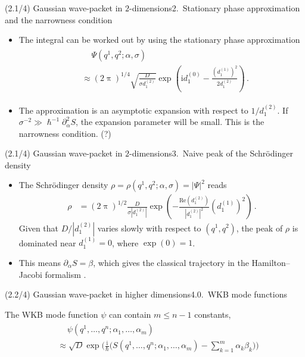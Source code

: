 \documentclass[mathserif]{beamer}
\newcommand{\rbr}[1]{{\left(#1\right)}}
\newcommand{\vbr}[1]{{\left|#1\right|}}
\newcommand{\rfun}[2]{#1\mathopen{}\left(#2\right)\mathclose{}}
\newcommand\mi{\mathrm{i}} %
\begin{document}
\begin{frame}{\boldmath (2.1/4) Gaussian wave-packet in $2$-dimensions}{2.\ Stationary phase approximation and the narrowness condition}
\begin{itemize}
    \item The integral can be worked out by using the stationary phase approximation
    \begin{align}
    \begin{split}
    &\quad\,\rfun{\varPsi}{q^1, q^2; \alpha, \sigma}
    \\
    &\approx \rbr{2\uppi}^{1/4}\sqrt{\frac{D}{\sigma d^{(2)}_1}}
    \rfun{\exp}{\mi d^{(0)}_1 - \frac{\rbr{d^{(1)}_1}^{2}}{2d^{(2)}_1}}\,.
    \end{split}
\end{align}
\item
The approximation is an asymptotic expansion with respect to $1/d_1^{(2)}$. If $\sigma^{-2} \gg \hslash^{-1} \partial_\alpha^2 S$, the expansion parameter will be small. This is the \alert{narrowness condition}. (?)

\end{itemize}
\end{frame}

\begin{frame}{\boldmath (2.1/4) Gaussian wave-packet in $2$-dimensions}{3.\ Naive peak of the Schr\"odinger density}
\begin{itemize}
    \item The Schr\"odinger density $\rho = \rfun{\rho}{q^1, q^2; \alpha, \sigma} = \vbr{\varPsi}^2$ reads
        \begin{align}
    \rho &= 
    \rbr{2\uppi}^{1/2}\frac{D}{\sigma \vbr{d^{(2)}_1}}
    \rfun{\exp}{-\frac{\rfun{\mathrm{Re}}{ d^{(2)}_1}}{\vbr{d^{(2)}_1}^2}\rbr{d^{(1)}_1}^{2}}\,.
\end{align}
Given that $D/\vbr{d^{(2)}_1}$ varies slowly with respect to $\rbr{q^1, q^2}$, the peak of $\rho$ is dominated near $d^{(1)}_1 = 0$, where $\rfun{\exp}{0} = 1$.
\item
This means $\partial_\alpha S = \beta$, which gives the classical trajectory in the Hamilton--Jacobi formalism .
\end{itemize}

\end{frame}

\begin{frame}{(2.2/4) Gaussian wave-packet in higher dimensions}{4.0.\ WKB mode functions}

The WKB mode function $\psi$ can contain $m \le n-1$ constants, 
\begin{align}
    \begin{split}
        &\quad\,\rfun{\psi}{q^1, \ldots, q^n; \alpha_1, \ldots, \alpha_m} 
        \\
        &\approx \sqrt{D} \exp\!\Bigg(\frac{\mi}{\hslash}
        \Bigg(\rfun{S}{q^1,\ldots, q^n; \alpha_1,\ldots, \alpha_m} - \sum_{k=1}^{m}\alpha_k \beta_k\Bigg)\Bigg)
    \end{split}
\end{align}
\end{frame}
\end{document}
